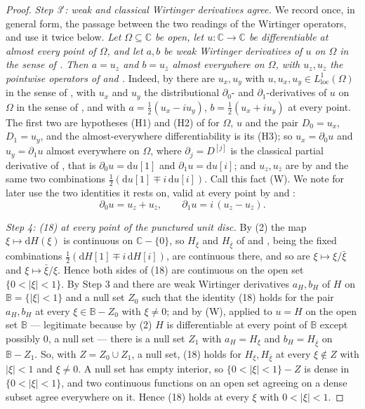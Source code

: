 \begin{proof}
\emph{Step 3$'$: weak and classical Wirtinger derivatives agree.}  We record
once, in general form, the passage between the two readings of the Wirtinger
operators, and use it twice below.  \emph{Let $\Omega\subseteq\mathbb{C}$ be
open, let $u\colon\mathbb{C}\to\mathbb{C}$ be differentiable at almost every
point of $\Omega$, and let $a,b$ be weak Wirtinger derivatives of $u$ on
$\Omega$ in the sense of .  Then $a=u_z$ and
$b=u_{\bar z}$ almost everywhere on $\Omega$, with $u_z,u_{\bar z}$ the
pointwise operators of  and .}  Indeed, by
 there are $u_x,u_y$ with
$u,u_x,u_y\in L^1_{\mathrm{loc}}(\Omega)$ in the sense of ,
with $u_x$ and $u_y$ the distributional $\partial_0$- and
$\partial_1$-derivatives of $u$ on $\Omega$ in the sense of
, and with $a=\tfrac12(u_x-iu_y)$,
$b=\tfrac12(u_x+iu_y)$ at every point.  The first two are hypotheses (H1) and
(H2) of  for $\Omega$, $u$ and the pair
$D_0=u_x$, $D_1=u_y$, and the almost-everywhere differentiability is its (H3);
so $u_x=\partial_0u$ and $u_y=\partial_1u$ almost everywhere on $\Omega$, where
$\partial_j=D^{[j]}$ is the classical partial derivative of
, that is $\partial_0u=\mathrm{d}u[1]$ and
$\partial_1u=\mathrm{d}u[i]$; and $u_z,u_{\bar z}$ are by  and
 the same two combinations
$\tfrac12(\mathrm{d}u[1]\mp i\,\mathrm{d}u[i])$.  Call this fact (W).  We note
for later use the two identities it rests on, valid at every point by
 and :
\begin{equation}\tag{2$'$}
  \partial_0u=u_z+u_{\bar z},\qquad \partial_1u=i\,(u_z-u_{\bar z}).
\end{equation}

\emph{Step 4: (18) at every point of the punctured unit disc.}  By (2) the map
$\xi\mapsto\mathrm{d}H(\xi)$ is continuous on $\mathbb{C}-\{0\}$, so $H_\xi$ and
$H_{\bar\xi}$ of  and , being the fixed combinations
$\tfrac12(\mathrm{d}H[1]\mp i\,\mathrm{d}H[i])$, are continuous there, and so
are $\xi\mapsto\xi/\bar\xi$ and $\xi\mapsto\bar\xi/\xi$.  Hence both sides of
(18) are continuous on the open set $\{0<|\xi|<1\}$.  By Step 3 and
 there are weak Wirtinger derivatives $a_H,b_H$ of $H$ on
$\mathbb{B}=\{|\xi|<1\}$ and a null set $Z_0$ such that the identity (18) holds
for the pair $a_H,b_H$ at every $\xi\in\mathbb{B}-Z_0$ with $\xi\neq0$; and by
(W), applied to $u=H$ on the open set $\mathbb{B}$ --- legitimate because by
(2) $H$ is differentiable at every point of $\mathbb{B}$ except possibly $0$,
a null set --- there is a null set $Z_1$ with $a_H=H_\xi$ and
$b_H=H_{\bar\xi}$ on $\mathbb{B}-Z_1$.  So, with $Z=Z_0\cup Z_1$, a null set,
(18) holds for $H_\xi,H_{\bar\xi}$ at every $\xi\notin Z$ with $|\xi|<1$ and
$\xi\neq0$.  A null set has empty interior, so
$\{0<|\xi|<1\}-Z$ is dense in $\{0<|\xi|<1\}$, and two continuous functions on
an open set agreeing on a dense subset agree everywhere on it.  Hence (18)
holds at every $\xi$ with $0<|\xi|<1$.


\end{proof}
